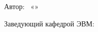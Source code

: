 \begin{singlespace}
	\vspace{\verticalspacesize}


	\noindent
	Автор: \authorwithinitials~«\uline{\hspace{\daysize}}»
	\uline{\hspace{6em}}
	\customtheyear
	\hfill
	\uline{\hspace{\signaturesize}}\hspace{\rightindentwithyear}

	\vspace{-0.3em}
	\hfill
	\hspace{\rightindentwithyear}

	\vspace{\verticalspacesize}

	\confirm
	\uline{\hfill}\customtheyear\hspace{\rightindent}

	\vspace{\verticalspacesize}

	\noindent
	Заведующий кафедрой ЭВМ: \headofdepartment
	\hfill
	\uline{\hspace{\signaturesize}}\hspace{\rightindentwithyear}

	\vspace{-0.3em}
	\hfill
	\hspace{\rightindentwithyear}

\end{singlespace}

